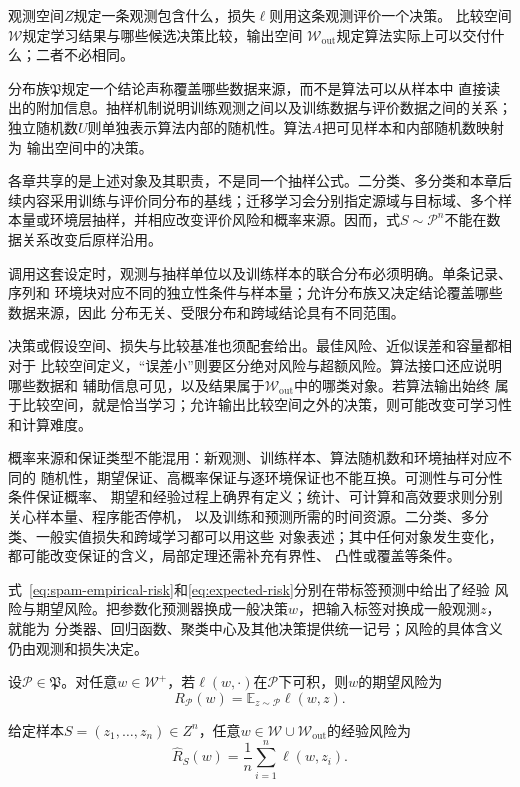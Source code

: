 观测空间$Z$规定一条观测包含什么，损失$\ell$则用这条观测评价一个决策。
比较空间$\mathcal W$规定学习结果与哪些候选决策比较，输出空间
$\mathcal W_{\mathrm{out}}$规定算法实际上可以交付什么；二者不必相同。

分布族$\mathfrak P$规定一个结论声称覆盖哪些数据来源，而不是算法可以从样本中
直接读出的附加信息。抽样机制说明训练观测之间以及训练数据与评价数据之间的关系；
独立随机数$U$则单独表示算法内部的随机性。算法$A$把可见样本和内部随机数映射为
输出空间中的决策。

各章共享的是上述对象及其职责，不是同一个抽样公式。二分类、多分类和本章后续内容采用训练与评价同分布的基线；迁移学习会分别指定源域与目标域、多个样本量或环境层抽样，并相应改变评价风险和概率来源。因而，式$S\sim\mathcal P^n$不能在数据关系改变后原样沿用。

调用这套设定时，观测与抽样单位以及训练样本的联合分布必须明确。单条记录、序列和
环境块对应不同的独立性条件与样本量；允许分布族又决定结论覆盖哪些数据来源，因此
分布无关、受限分布和跨域结论具有不同范围。

决策或假设空间、损失与比较基准也须配套给出。最佳风险、近似误差和容量都相对于
比较空间定义，“误差小”则要区分绝对风险与超额风险。算法接口还应说明哪些数据和
辅助信息可见，以及结果属于$\mathcal W_{\mathrm{out}}$中的哪类对象。若算法输出始终
属于比较空间，就是恰当学习；允许输出比较空间之外的决策，则可能改变可学习性和计算难度。

概率来源和保证类型不能混用：新观测、训练样本、算法随机数和环境抽样对应不同的
随机性，期望保证、高概率保证与逐环境保证也不能互换。可测性与可分性条件保证概率、
期望和经验过程上确界有定义；统计、可计算和高效要求则分别关心样本量、程序能否停机，
以及训练和预测所需的时间资源。二分类、多分类、一般实值损失和跨域学习都可以用这些
对象表述；其中任何对象发生变化，都可能改变保证的含义，局部定理还需补充有界性、
凸性或覆盖等条件。

式~\eqref{eq:spam-empirical-risk}和\eqref{eq:expected-risk}分别在带标签预测中给出了经验
风险与期望风险。把参数化预测器换成一般决策$w$，把输入标签对换成一般观测$z$，就能为
分类器、回归函数、聚类中心及其他决策提供统一记号；风险的具体含义仍由观测和损失决定。

\begin{definition}[一般学习问题的期望风险]
\label{def:general-population-risk}
设$\mathcal P\in\mathfrak P$。对任意$w\in\mathcal W^+$，若$\ell(w,\cdot)$在$\mathcal P$下可积，则$w$的期望风险为
\[
 R_{\mathcal P}(w)=\mathbb E_{z\sim\mathcal P}\ell(w,z).
\]
\end{definition}

\begin{definition}[一般学习问题的经验风险]
\label{def:general-empirical-risk}
给定样本$S=(z_1,\ldots,z_n)\in Z^n$，任意$w\in\mathcal W\cup\mathcal W_{\mathrm{out}}$的经验风险为
\begin{equation}
 \hat R_S(w)=\frac1n\sum_{i=1}^n\ell(w,z_i).
 \label{eq:general-risk}
\end{equation}
\end{definition}

